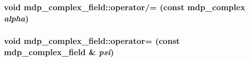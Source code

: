 \label{classmdp__complex__field_a0d2bffa4819135c1ef77c0c9fb22504e}
\hypertarget{classmdp__complex__field_ab204658a9026e7936b8725ad4f3172ef}{
\subsubsection[{operator/=}]{\setlength{\rightskip}{0pt plus 5cm}void mdp\_\-complex\_\-field::operator/= (const {\bf mdp\_\-complex} {\em alpha})}}
\label{classmdp__complex__field_ab204658a9026e7936b8725ad4f3172ef}
\hypertarget{classmdp__complex__field_ad2b736ae31e3ee1f955c10f6ad40928f}{
\subsubsection[{operator=}]{\setlength{\rightskip}{0pt plus 5cm}void mdp\_\-complex\_\-field::operator= (const {\bf mdp\_\-complex\_\-field} \& {\em psi})}}
\label{classmdp__complex__field_ad2b736ae31e3ee1f955c10f6ad40928f}


